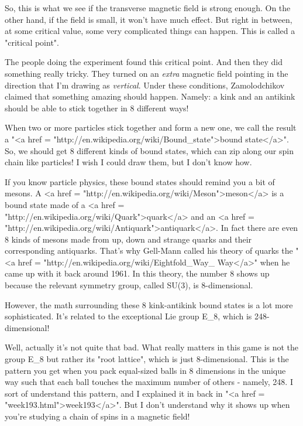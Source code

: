 So, this is what we see if the transverse magnetic field is strong
enough.  On the other hand, if the field is small, it won't have much
effect.  But right in between, at some critical value, some very
complicated things can happen.  This is called a "critical point".

The people doing the experiment found this critical point.  And then
they did something really tricky.  They turned on an \emph{extra}
magnetic field pointing in the direction that I'm drawing as
\emph{vertical}.  Under these conditions, Zamolodchikov claimed that
something amazing should happen.  Namely: a kink and an antikink
should be able to stick together in 8 different ways!

When two or more particles stick together and form a new one, we call
the result a "<a href =
"http://en.wikipedia.org/wiki/Bound_state">bound state</a>".  So,
we should get 8 different kinds of bound states, which can zip along
our spin chain like particles!  I wish I could draw them, but I don't
know how.

If you know particle physics, these bound states should remind you a
bit of mesons.  A <a href =
"http://en.wikipedia.org/wiki/Meson">meson</a> is a bound state made
of a <a href = "http://en.wikipedia.org/wiki/Quark">quark</a> and an
<a href = "http://en.wikipedia.org/wiki/Antiquark">antiquark</a>.  In
fact there are even 8 kinds of mesons made from up, down and strange
quarks and their corresponding antiquarks.  That's why Gell-Mann
called his theory of quarks the "<a href =
"http://en.wikipedia.org/wiki/Eightfold_Way_%
Way</a>" when he came up with it back around 1961.  In this
theory, the number 8 shows up because the relevant symmetry group,
called SU(3), is 8-dimensional.

However, the math surrounding these 8 kink-antikink bound states is a
lot more sophisticated.  It's related to the exceptional Lie group
E_{8}, which is 248-dimensional!

Well, actually it's not quite that bad.  What really matters in this
game is not the group E_{8} but rather its "root
lattice", which is just 8-dimensional.  This is the pattern you
get when you pack equal-sized balls in 8 dimensions in the unique way
such that each ball touches the maximum number of others - namely,
248.  I sort of understand this pattern, and I explained it in back in
"<a href = "week193.html">week193</a>".  But I don't understand
why it shows up when you're studying a chain of spins in a magnetic
field!

